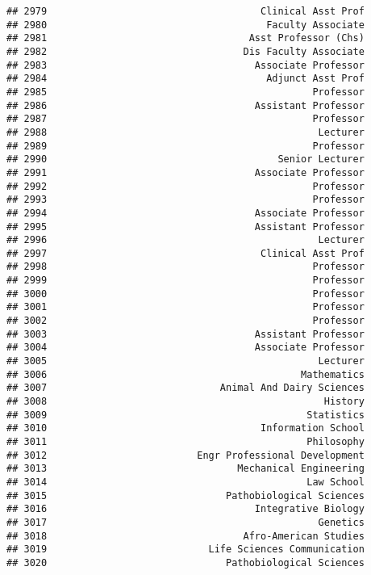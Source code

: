 \documentclass[
]{article}
\begin{document}
\begin{verbatim}
## 2979                                     Clinical Asst Prof
## 2980                                      Faculty Associate
## 2981                                   Asst Professor (Chs)
## 2982                                  Dis Faculty Associate
## 2983                                    Associate Professor
## 2984                                      Adjunct Asst Prof
## 2985                                              Professor
## 2986                                    Assistant Professor
## 2987                                              Professor
## 2988                                               Lecturer
## 2989                                              Professor
## 2990                                        Senior Lecturer
## 2991                                    Associate Professor
## 2992                                              Professor
## 2993                                              Professor
## 2994                                    Associate Professor
## 2995                                    Assistant Professor
## 2996                                               Lecturer
## 2997                                     Clinical Asst Prof
## 2998                                              Professor
## 2999                                              Professor
## 3000                                              Professor
## 3001                                              Professor
## 3002                                              Professor
## 3003                                    Assistant Professor
## 3004                                    Associate Professor
## 3005                                               Lecturer
## 3006                                            Mathematics
## 3007                              Animal And Dairy Sciences
## 3008                                                History
## 3009                                             Statistics
## 3010                                     Information School
## 3011                                             Philosophy
## 3012                          Engr Professional Development
## 3013                                 Mechanical Engineering
## 3014                                             Law School
## 3015                               Pathobiological Sciences
## 3016                                    Integrative Biology
## 3017                                               Genetics
## 3018                                  Afro-American Studies
## 3019                            Life Sciences Communication
## 3020                               Pathobiological Sciences

\end{verbatim}
\end{document}
